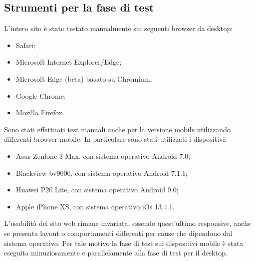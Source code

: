 \subsection{Strumenti per la fase di test}
L'intero sito è stato testato manualmente sui seguenti browser da desktop:
\begin{itemize}
	\item Safari;
	\item Microsoft Internet Explorer/Edge;
	\item Microsoft Edge (beta) basato su Chromium;
	\item Google Chrome;
	\item Mozilla Firefox.
\end{itemize}
Sono stati effettuati test manuali anche per la versione mobile utilizzando differenti browser mobile. In particolare sono stati utilizzati i dispositivi:
\begin{itemize}
	\item Asus Zenfone 3 Max, con sistema operativo Android 7.0;
	\item Blackview bv9000, con sistema operativo Android 7.1.1;
	\item Huawei P20 Lite, con sistema operativo Android 9.0;
	\item Apple iPhone XS, con sistema operativo iOs 13.4.1.
\end{itemize}
L’usabilità del sito web rimane invariata, essendo quest’ultimo responsive, anche se presenta layout o comportamenti differenti per cause che dipendono dal sistema operativo. Per tale motivo la fase di test sui dispositivi mobile è stata eseguita minuziosamente e parallelamente alla fase di test per il desktop.

